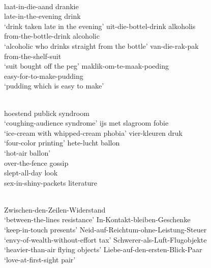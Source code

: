 \documentclass[output=paper]{LSP/langsci}
\begin{document}
\ea
          \\
      \ea\label{ex:pafel:22a}      
      \gll  laat-in-die-aand drankie   \\
            late-in-the-evening drink   \\
      \glt  `drink taken late in the evening'
      \ex\label{ex:pafel:22b}
      \gll   uit-die-bottel-drink alkoholis  \\
             from-the-bottle-drink alcoholic  \\
      \glt  `alcoholic who drinks straight from the bottle'
      \ex\label{ex:pafel:22c}
      \gll   van-die-rak-pak  \\
             from-the-shelf-suit  \\
      \glt  `suit bought off the peg' 
      \ex\label{ex:pafel:22d}
      \gll   maklik-om-te-maak-poeding  \\
             easy-for-to-make-pudding  \\
      \glt  `pudding which is easy to make' 
   \z
\z
 
     
\ea
      \\
      \ea\label{ex:pafel:23a}      
        hoestend publick syndroom \\
      \glt  `coughing-audience syndrome'
      \ex\label{ex:pafel:23b}
         ijs met slagroom fobie  \\
      \glt  `ice-cream with whipped-cream phobia'
      \ex\label{ex:pafel:23c}
         vier-kleuren druk  \\
      \glt  `four-color printing'
      \ex\label{ex:pafel:23d}
         hete-lucht ballon \\
      \glt  `hot-air ballon'
    \z
\z      
   \largerpage[2]
\ea
      \\
      \ea\label{ex:pafel:24a}      
        over-the-fence gossip   \\
      \ex\label{ex:pafel:24b}
        slept-all-day look \\
      \ex\label{ex:pafel:24c}
        sex-in-shiny-packets literature 
    \z
\z
 
\ea
      \\
      \ea\label{ex:pafel:25a}      
        Zwischen-den-Zeilen-Widerstand   \\
      \glt  ‘between-the-lines resistance’
      \ex\label{ex:pafel:25b}
         In-Kontakt-bleiben-Geschenke   \\
      \glt  `keep-in-touch presents'
      \ex\label{ex:pafel:25c}
         Neid-auf-Reichtum-ohne-Leistung-Steuer   \\
      \glt  `envy-of-wealth-without-effort tax'
      \ex\label{ex:pafel:25d}
         Schwerer-als-Luft-Flugobjekte   \\
      \glt  `heavier-than-air flying objects'      
      \ex\label{ex:pafel:25e}
         Liebe-auf-den-ersten-Blick-Paar   \\
      \glt  `love-at-first-sight pair'
    \z
\z 
\end{document}
